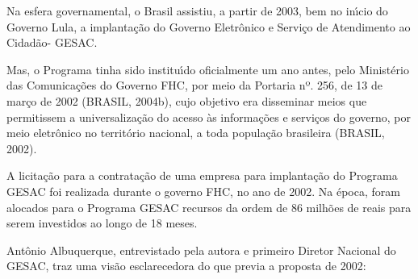 \documentclass[
12pt,		%
openright,	%
twoside,  %
a4paper,			%
chapter=TITLE,		%
english,			%
french,				%
spanish,			%
brazil				%
]{USPSC-classe/USPSC}
\begin{document}
Na esfera governamental, o Brasil assistiu, a partir de 2003, bem no in\'{\i}cio do Governo Lula, a implanta\c{c}\~ao do Governo Eletr\^onico e Servi\c{c}o de Atendimento ao Cidad\~ao- GESAC.

















Mas, o Programa tinha sido institu\'{\i}do oficialmente um ano antes, pelo Minist\'erio das Comunica\c{c}\~oes do Governo FHC, por meio  da Portaria nº. 256, de 13 de mar\c{c}o de 2002 (BRASIL, 2004b), cujo  objetivo era disseminar meios que permitissem a universaliza\c{c}\~ao do acesso \`as informa\c{c}\~oes e servi\c{c}os do governo, por meio eletr\^onico no territ\'orio nacional, a toda popula\c{c}\~ao brasileira (BRASIL, 2002).

















A licita\c{c}\~ao para a contrata\c{c}\~ao de uma empresa para implanta\c{c}\~ao do Programa GESAC foi realizada durante o governo FHC, no ano de 2002. Na \'epoca, foram alocados para o Programa GESAC recursos da ordem de 86 milh\~oes de reais para serem investidos ao longo de 18 meses.

















Ant\^onio Albuquerque, entrevistado pela autora e primeiro Diretor Nacional do GESAC, traz uma vis\~ao esclarecedora do que previa a proposta de 2002:
\end{document}
